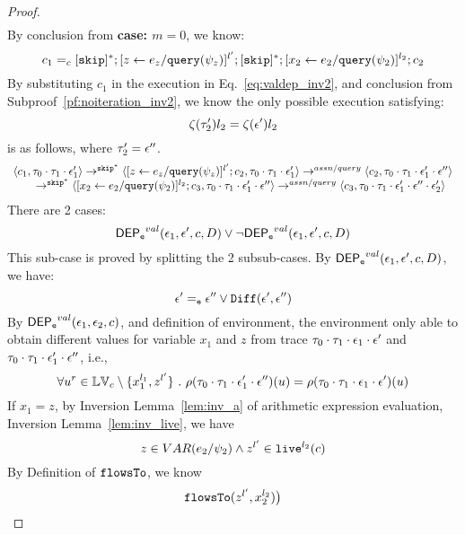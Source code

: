 {\begin{proof}
\begin{equation}
\begin{array}{l}
\end{array}
 \end{equation}
By conclusion from \textbf{case: $m = 0$}, we know:
 \[
 c_1 =_c 
 [\mathtt{skip}]{}^*;[\mathrel{ z \leftarrow e_z / {\tt query}(\psi_z) }]^{l'};  [\mathtt{skip}]{}^*; [\mathrel{ {x}_2 \leftarrow e_2 / {\tt query}(\psi_2) }]^{l_2};{c}_2
 \]
 By substituting $c_1$ in the execution in Eq.~\ref{eq:valdep_inv2}, and conclusion from Subproof~\ref{pf:noiteration_inv2}, we know the only possible execution satisfying:
 \[
  \mathtt{\zeta}(\mathtt{\tau}_2') l_2 = \mathtt{\zeta}(\mathtt{\epsilon}') l_2
\]
%
 is as follows, where $\mathtt{\tau}_2' = \mathtt{\epsilon}''$.
\begin{equation}
\label{eq:m1asn_inv2}
  \begin{array}{l}   
  \langle c_1, \mathtt{\tau}_0 \cdot \mathtt{\tau}_1 \cdot \mathtt{\epsilon}_1' \rangle 
  \rightarrow^{\mathtt{skip}^*} 
  \langle [\mathrel{ z \leftarrow e_z / {\tt query}(\psi_z) }]^{l'};{c}_2, 
  \mathtt{\tau}_0 \cdot \mathtt{\tau}_1 \cdot \mathtt{\epsilon}_1' \rangle 
  \rightarrow^{assn/query} 
  \langle {c}_2,  \mathtt{\tau}_0 \cdot \mathtt{\tau}_1 \cdot \mathtt{\epsilon}_1' \cdot \mathtt{\epsilon}'' \rangle  \\
  \qquad \rightarrow^{\mathtt{skip}^*} 
  \langle [\mathrel{ {x}_2 \leftarrow e_2 / {\tt query}(\psi_2) }]^{l_2};{c}_3, 
  \mathtt{\tau}_0 \cdot \mathtt{\tau}_1 \cdot \mathtt{\epsilon}_1' \cdot \mathtt{\epsilon}'' \rangle 
  \rightarrow^{assn/query} 
  \langle {c}_3,  \mathtt{\tau}_0 \cdot \mathtt{\tau}_1 \cdot \mathtt{\epsilon}_1' \cdot \mathtt{\epsilon}'' \cdot \mathtt{\epsilon}_2' \rangle 
\end{array}
 \end{equation}
 There are 2 cases:
%
\[
\mathsf{DEP_{\mathtt{e}}}^{val}(\mathtt{\epsilon}_1, \mathtt{\epsilon}', c, D) \lor \neg \mathsf{DEP_{\mathtt{e}}}^{val}(\mathtt{\epsilon}_1, \mathtt{\epsilon}', c, D)
\]
%
This sub-case is proved by splitting the 2 subsub-cases.
%
%
By $\mathsf{DEP_{\mathtt{e}}}^{val}(\mathtt{\epsilon}_1, \mathtt{\epsilon}', c, D)$, we have:
%
\[
  \mathtt{\epsilon}' =_{\mathtt{e}} \mathtt{\epsilon}'' \lor \mathtt{Diff}(\mathtt{\epsilon}', \mathtt{\epsilon}'')
\]
%
By $\mathsf{DEP_{\mathtt{e}}}^{val}(\mathtt{\epsilon}_1, \mathtt{\epsilon}_2, c)$, and definition of environment, 
the environment only able to obtain different values for variable $x_1$ and $z$
from trace $\mathtt{\tau}_0 \cdot \mathtt{\tau}_1 \cdot \mathtt{\epsilon}_1 \cdot \mathtt{\epsilon}'$ and 
$\mathtt{\tau}_0 \cdot \mathtt{\tau}_1 \cdot \mathtt{\epsilon}_1' \cdot \mathtt{\epsilon}''$, i.e.,
%
\[
  \forall u^r \in \mathbb{LV}_c \setminus \{x_1^{l_1}, z^{l'}\} ~.~
  \rho(\mathtt{\tau}_0 \cdot \mathtt{\tau}_1 \cdot \mathtt{\epsilon}_1' \cdot \mathtt{\epsilon}'') (u) =  
  \rho(\mathtt{\tau}_0 \cdot \mathtt{\tau}_1 \cdot \mathtt{\epsilon}_1 \cdot \mathtt{\epsilon}') (u)
\]
%
If $x_1 = z$, by {Inversion Lemma~\ref{lem:inv_a}} of arithmetic expression evaluation, Inversion Lemma~\ref{lem:inv_live}, we have 
%
\[
  z \in VAR(e_2 / \psi_2)
  \land z^{l'}\in \mathtt{live}^{l_2}(c)
\]
%
By Definition of $\mathtt{flowsTo}$, we know
\[
  \mathtt{flowsTo}(z^{l'}, x_2^{l_2}) \big)
\]


\end{proof}}

